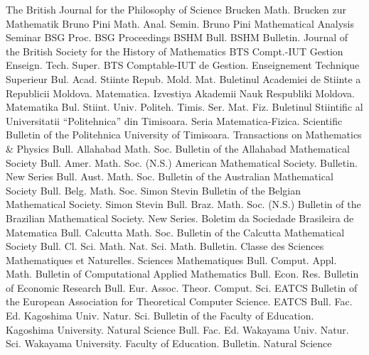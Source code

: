 {The British Journal for the Philosophy of Science}
{Brucken Math.}
{Brucken zur Mathematik}
{Bruno Pini Math. Anal. Semin.}
{Bruno Pini Mathematical Analysis Seminar}
{BSG Proc.}
{BSG Proceedings}
{BSHM Bull.}
{BSHM Bulletin. Journal of the British Society for the History of Mathematics}
{BTS Compt.-IUT Gestion Enseign. Tech. Super.}
{BTS Comptable-IUT de Gestion. Enseignement Technique Superieur}
{Bul. Acad. Stiinte Repub. Mold. Mat.}
{Buletinul Academiei de Stiinte a Republicii Moldova. Matematica. Izvestiya Akademii Nauk Respubliki Moldova. Matematika}
{Bul. Stiint. Univ. Politeh. Timis. Ser. Mat. Fiz.}
{Buletinul Stiintific al Universitatii ``Politehnica'' din Timisoara. Seria Matematica-Fizica. Scientific Bulletin of the Politehnica University of Timisoara. Transactions on Mathematics & Physics}
{Bull. Allahabad Math. Soc.}
{Bulletin of the Allahabad Mathematical Society}
{Bull. Amer. Math. Soc. (N.S.)}
{American Mathematical Society. Bulletin. New Series}
{Bull. Aust. Math. Soc.}
{Bulletin of the Australian Mathematical Society}
{Bull. Belg. Math. Soc. Simon Stevin}
{Bulletin of the Belgian Mathematical Society. Simon Stevin}
{Bull. Braz. Math. Soc. (N.S.)}
{Bulletin of the Brazilian Mathematical Society. New Series. Boletim da Sociedade Brasileira de Matematica}
{Bull. Calcutta Math. Soc.}
{Bulletin of the Calcutta Mathematical Society}
{Bull. Cl. Sci. Math. Nat. Sci. Math.}
{Bulletin. Classe des Sciences Mathematiques et Naturelles. Sciences Mathematiques}
{Bull. Comput. Appl. Math.}
{Bulletin of Computational Applied Mathematics}
{Bull. Econ. Res.}
{Bulletin of Economic Research}
{Bull. Eur. Assoc. Theor. Comput. Sci. EATCS}
{Bulletin of the European Association for Theoretical Computer Science. EATCS}
{Bull. Fac. Ed. Kagoshima Univ. Natur. Sci.}
{Bulletin of the Faculty of Education. Kagoshima University. Natural Science}
{Bull. Fac. Ed. Wakayama Univ. Natur. Sci.}
{Wakayama University. Faculty of Education. Bulletin. Natural Science}
